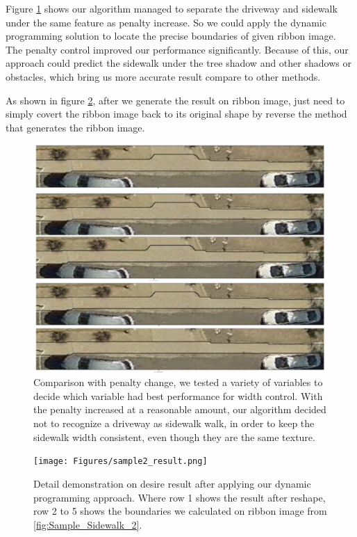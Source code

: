 Figure \ref{fig:penalty} shows our algorithm managed to separate the driveway and sidewalk under the same feature as penalty increase. So we could apply the dynamic programming solution to locate the precise boundaries of given ribbon image. The penalty control improved our performance significantly. Because of this, our approach could predict the sidewalk under the tree shadow and other shadows or obstacles, which bring us more accurate result compare to other methods.

As shown in figure \ref{fig:sample_result2}, after we generate the result on ribbon image, just need to simply covert the ribbon image back to its original shape by reverse the method that generates the ribbon image. 

\begin{figure}[H]
    \centering
    \includegraphics[width=\textwidth]{Figures/penalty.pdf}
    \caption[Penalty Process]{Comparison with penalty change, we tested a variety of variables to decide which variable had best performance for width control. With the penalty increased at a reasonable amount, our algorithm decided not to recognize a driveway as sidewalk walk, in order to keep the sidewalk width consistent, even though they are the same texture.}
    \label{fig:penalty}
\end{figure}

\begin{figure}
    \centering
    \texttt{[image: Figures/sample2\_result.png]}
    \caption[Desire Output on Sample Sidewalk]{Detail demonstration on desire result after applying our dynamic programming approach. Where row 1 shows the result after reshape, row 2 to 5 shows the boundaries we calculated on ribbon image from \ref{fig:Sample_Sidewalk_2}.}
    \label{fig:sample_result2}
\end{figure}

